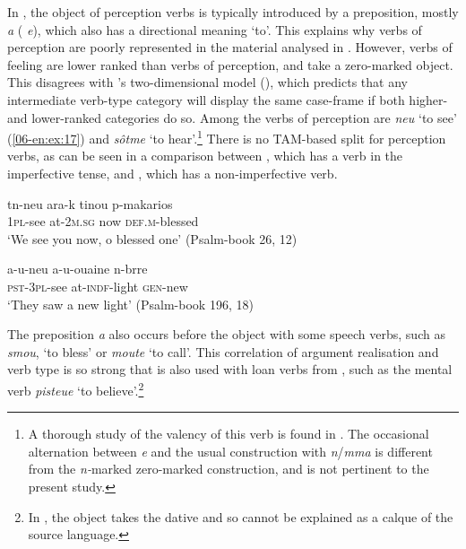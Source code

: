 \documentclass[output=paper]{LSP/langsci}
\begin{document}
In , the object of perception verbs is typically introduced by a preposition, mostly \textit{a} (\textit{ e}), which also has a directional meaning ‘to’. This explains why verbs of perception are poorly represented in the material analysed in . However, verbs of feeling are lower ranked than verbs of perception, and take a zero-marked object. This disagrees with \citeauthor{Malchukov2005Case}’s two-dimensional model (\citeyear[81]{Malchukov2005Case}), 
which predicts that any intermediate verb-type category will display the same case-frame if both higher- and lower-ranked categories do so. Among the verbs of perception are \textit{neu} ‘to see’ (\eg  \ref{06-en:ex:17}) and \textit{sôtme} ‘to hear’.\footnote{A thorough study of the valency of this verb is found in \citet{Emmel2006Coptic}. The occasional alternation between \textit{e} and the usual construction with \textit{n}/\textit{mma} is different from the \textit{n-}marked \vs zero-marked construction, and is not pertinent to the present study.} There is no TAM-based split for perception verbs, as can be seen in a comparison between , which has a verb in the imperfective tense, and , which has a non-imperfective verb. 

\begin{exe}
\ex \label{06-en:ex:17}
\begin{xlist}
\ex \label{06-en:ex:17a}
\gll tn-neu ara-k tinou p-makarios\\
	\textsc{1pl-}see at-2\textsc{m.sg} now \textsc{def.m-}blessed\\
\glt ‘We see you now, o blessed one’ (Psalm-book 26, 12)

\ex\label{06-en:ex:17b}
\gll a-u-neu		 a-u-ouaine 	n-brre\\
	\textsc{pst-3pl-}see at-\textsc{indf-}light \textsc{gen-}new\\
\glt ‘They saw a new light’ (Psalm-book 196, 18)

\end{xlist}
\end{exe}

The preposition \textit{a} also occurs before the object with some speech verbs, such as \textit{smou}, ‘to bless’ or \textit{moute} ‘to call’. This correlation of argument realisation and verb type is so strong that is also used with loan verbs from , such as the mental verb \textit{pisteue} ‘to believe’.\footnote{In , the object takes the dative and so cannot be explained as a calque of the source language.}
\end{document}
